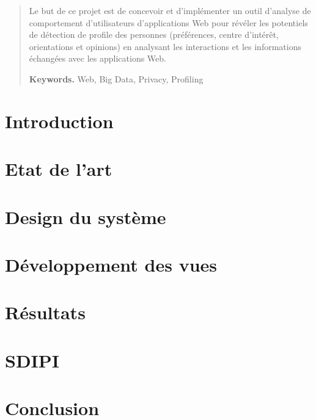 






\def\myTitle{Développement d'une Application Web pour la Visualisation et la Recherche de Données Médicales}
\def\myName{Kewin Dousse}
\def\myUni{HES-SO}
\def\myDepartment{TIC}
\def\mySupervisors{Sandy Ingram}
\def\myExpert{?}


\begin{abstract}

Le but de ce projet est de concevoir et d'implémenter un outil d'analyse de comportement d'utilisateurs d'applications Web pour révéler les potentiels de détection de profile des personnes (préférences, centre d'intérêt, orientations et opinions) en analysant les interactions et les informations échangées avec les applications Web.

\smallskip
\noindent \textbf{Keywords.} Web, Big Data, Privacy, Profiling

\end{abstract}
\setcounter{page}{3}
\hypersetup{pageanchor=true}

\tableofcontents
\listoffigures

\chapter{Introduction}

\chapter{Etat de l'art}

\chapter{Design du système}

\chapter{Développement des vues}

\chapter{Résultats}

\chapter{SDIPI}

\chapter{Conclusion}


